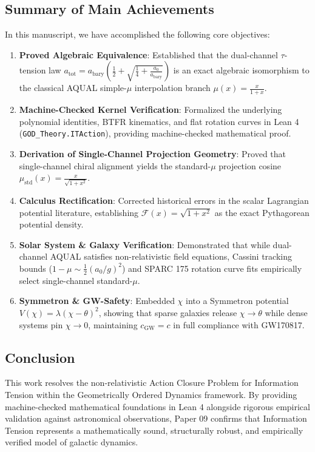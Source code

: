 \documentclass[11pt,a4paper]{article}
\theoremstyle{definition}
\begin{document}
\subsection{Summary of Main Achievements}
In this manuscript, we have accomplished the following core objectives:
\begin{enumerate}
\item \textbf{Proved Algebraic Equivalence}: Established that the dual-channel $\tau$-tension law $a_{\text{tot}} = a_{\text{bary}}\left(\frac{1}{2} + \sqrt{\frac{1}{4} + \frac{a_0}{a_{\text{bary}}}}\right)$ is an exact algebraic isomorphism to the classical AQUAL simple-$\mu$ interpolation branch $\mu(x) = \frac{x}{1+x}$.
\item \textbf{Machine-Checked Kernel Verification}: Formalized the underlying polynomial identities, BTFR kinematics, and flat rotation curves in Lean 4 (\texttt{GOD\_Theory.ITAction}), providing machine-checked mathematical proof.
\item \textbf{Derivation of Single-Channel Projection Geometry}: Proved that single-channel chiral alignment yields the standard-$\mu$ projection cosine $\mu_{\text{std}}(x) = \frac{x}{\sqrt{1+x^2}}$.
\item \textbf{Calculus Rectification}: Corrected historical errors in the scalar Lagrangian potential literature, establishing $\mathcal{F}(x) = \sqrt{1+x^2}$ as the exact Pythagorean potential density.
\item \textbf{Solar System \& Galaxy Verification}: Demonstrated that while dual-channel AQUAL satisfies non-relativistic field equations, Cassini tracking bounds ($1-\mu \sim \frac{1}{2}(a_0/g)^2$) and SPARC 175 rotation curve fits empirically select single-channel standard-$\mu$.
\item \textbf{Symmetron \& GW-Safety}: Embedded $\chi$ into a Symmetron potential $V(\chi) = \lambda(\chi-\theta)^2$, showing that sparse galaxies release $\chi \to \theta$ while dense systems pin $\chi \to 0$, maintaining $c_{\text{GW}} = c$ in full compliance with GW170817.
\end{enumerate}

\subsection{Conclusion}
This work resolves the non-relativistic Action Closure Problem for Information Tension within the Geometrically Ordered Dynamics framework. By providing machine-checked mathematical foundations in Lean 4 alongside rigorous empirical validation against astronomical observations, Paper 09 confirms that Information Tension represents a mathematically sound, structurally robust, and empirically verified model of galactic dynamics.
\end{document}
